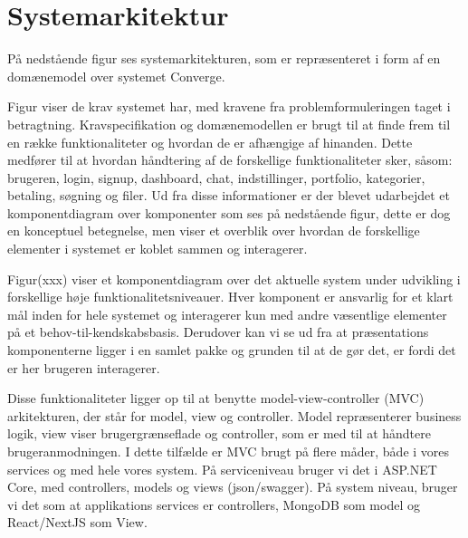 
\section{Systemarkitektur}
På nedstående figur ses systemarkitekturen, som er repræsenteret i form af en domænemodel over systemet Converge.


Figur viser de krav systemet har, med kravene fra problemformuleringen taget i betragtning. Kravspecifikation og domænemodellen er brugt til at finde frem til en række funktionaliteter og hvordan de er afhængige af hinanden. Dette medfører til at hvordan håndtering af de forskellige funktionaliteter sker, såsom: brugeren, login, signup, dashboard, chat, indstillinger, portfolio, kategorier, betaling, søgning og filer. Ud fra disse informationer er der blevet udarbejdet et komponentdiagram over komponenter som ses på nedstående figur, dette er dog en konceptuel betegnelse, men viser et overblik over hvordan de forskellige elementer i systemet er koblet sammen og interagerer.


Figur(xxx) viser et komponentdiagram over det aktuelle system under udvikling i forskellige høje funktionalitetsniveauer. Hver komponent er ansvarlig for et klart mål inden for hele systemet og interagerer kun med andre væsentlige elementer på et behov-til-kendskabsbasis. Derudover kan vi se ud fra at præsentations komponenterne ligger i en samlet pakke og grunden til at de gør det, er fordi det er her brugeren interagerer.

Disse funktionaliteter ligger op til at benytte model-view-controller (MVC) \cite[MVC]{converge-terms} arkitekturen, der står for model, view og controller. Model repræsenterer business logik, view viser brugergrænseflade og controller, som er med til at håndtere brugeranmodningen. I dette tilfælde er MVC brugt på flere måder, både i vores services og med hele vores system. På serviceniveau bruger vi det i ASP.NET Core, med controllers, models og views (json/swagger). På system niveau, bruger vi det som at applikations services er controllers, MongoDB som model og React/NextJS som View.




